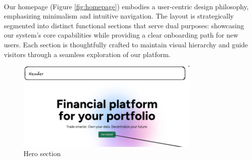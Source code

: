 \paragraph{}Our homepage (Figure \ref{fig:homepage}) embodies a user-centric design philosophy, emphasizing minimalism and intuitive navigation. The layout is strategically segmented into distinct functional sections that serve dual purposes: showcasing our system's core capabilities while providing a clear onboarding path for new users. Each section is thoughtfully crafted to maintain visual hierarchy and guide visitors through a seamless exploration of our platform.
  \begin{figure}[h]
    \centering
    \includegraphics[width= 0.8\textwidth, keepaspectratio]{root/hero.png}
     \caption{Hero section}
    \label{fig:hero}
\end{figure}
